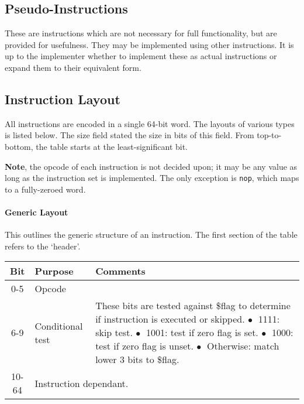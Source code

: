 \documentclass[10pt]{article}
\begin{document}
\subsection{Pseudo-Instructions}

These are instructions which are not necessary for full functionality, but are provided for usefulness.
They may be implemented using other instructions.
It is up to the implementer whether to implement these as actual instructions or expand them to their equivalent form.

\subsection{Instruction Layout}

All instructions are encoded in a single 64-bit word.
The layouts of various types is listed below.
The size field stated the size in bits of this field.
From top-to-bottom, the table starts at the least-significant bit.

\textbf{Note}, the opcode of each instruction is not decided upon; it may be any value as long as the instruction set is implemented.
The only exception is \texttt{nop}, which maps to a fully-zeroed word.

\paragraph{Generic Layout}
This outlines the generic structure of an instruction.
The first section of the table refers to the `header'.

\bigskip
\begin{tabular}{|c|l|l|}
    \hline
    \textbf{Bit} & \textbf{Purpose} & \textbf{Comments} \\
    \hline
    0-5 & Opcode & \\
    \hline
    6-9 & Conditional test & \makecell[l]{These bits are tested against \$flag to determine if instruction is executed or skipped.\\%
    \(\bullet\;\) 1111: skip test.\\%
    \(\bullet\;\) 1001: test if zero flag is set.\\%
    \(\bullet\;\) 1000: test if zero flag is unset.\\%
    \(\bullet\;\) Otherwise: match lower 3 bits to \$flag.} \\
    \hline
    \hline
    10-64 & \multicolumn{2}{l|}{Instruction dependant.} \\
    \hline
\end{tabular}
\end{document}
